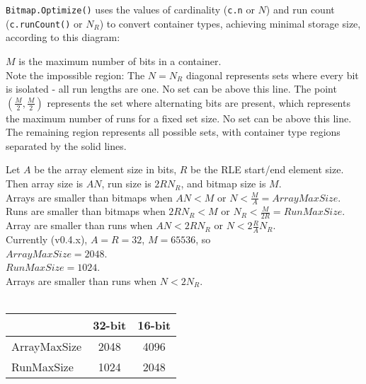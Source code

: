 \documentclass{article} %
\begin{document}

\texttt{Bitmap.Optimize()} uses the values of cardinality (\texttt{c.n} or $N$) and
run count (\texttt{c.runCount()} or $N_R$) to convert container types, achieving minimal storage size, according to this diagram:\\


$M$ is the maximum number of bits in a container.\\

Note the impossible region: The $N = N_R$ diagonal represents sets where every
bit is isolated - all run lengths are one. No set can be above this line. The
point $(\frac{M}{2}, \frac{M}{2})$ represents the set where alternating bits are
present, which represents the maximum number of runs for a fixed set size. No
set can be above this line. The remaining region represents all possible sets,
with container type regions separated by the solid lines.


\bigskip


Let $A$ be the array element size in bits, $R$ be the RLE start/end element size. Then array size is $AN$, run size is
$2RN_R$, and bitmap size is $M$.\\

Arrays are smaller than bitmaps when $AN < M$ or $N < \frac{M}{A} = ArrayMaxSize$.\\
Runs are smaller than bitmaps when $2RN_R < M$ or $N_R < \frac{M}{2R} = RunMaxSize$.\\
Array are smaller than runs when $AN < 2RN_R$ or $N < 2\frac{R}{A} N_R$.\\

Currently (v0.4.x), $A = R = 32$, $M = 65536$, so\\ 

$ArrayMaxSize = 2048$.\\
$RunMaxSize = 1024$.\\
Arrays are smaller than runs when $N < 2 N_R$.\\
\\
\begin{tabular}{l | c | c}
    & 32-bit & 16-bit \\
  \hline
  ArrayMaxSize & 2048 & 4096 \\
  \hline
  RunMaxSize & 1024 & 2048 \\
\end{tabular}
\end{document}

